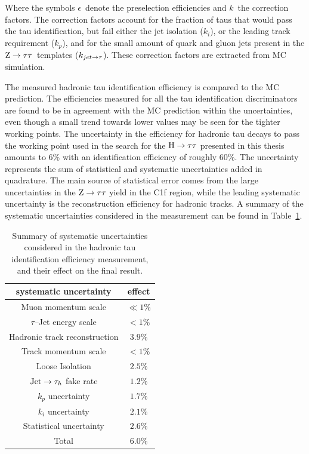Where the symbols $\epsilon$\ denote the preselection efficiencies and $k$\ the correction factors. The correction factors account for the fraction of taus that would pass the tau identification, but fail either the jet isolation ($k_i$), or the leading track requirement ($k_p$), and for the small amount of quark and gluon jets present in the $\mathrm{Z}\rightarrow\tau\tau$\ templates ($k_{jet \rightarrow \tau}$). These correction factors are extracted from MC simulation. 

The measured hadronic tau identification efficiency is compared to the MC prediction. %
The efficiencies measured for all the tau identification discriminators are found to be in agreement with the MC prediction within the uncertainties, even though a small trend towards lower values may be seen for the tighter working points. The uncertainty in the efficiency for hadronic tau decays to pass the working point used in the search for the $\mathrm{H}\rightarrow\tau\tau$ presented in this thesis amounts to 
 6\% with an identification efficiency of roughly 60\%. The uncertainty represents the sum of statistical and systematic uncertainties added in quadrature. The main source of statistical error comes from the large uncertainties in the $\mathrm{Z}\rightarrow\tau\tau$ yield in the C1f region, while the leading systematic uncertainty is the reconstruction efficiency for hadronic tracks. A summary of the systematic uncertainties considered in the measurement can be found in Table~\ref{tab:tau_eff_sys}.

\begin{table}
\begin{center}
\caption{Summary of systematic uncertainties considered in the hadronic tau identification efficiency measurement, and their effect on the final result.}
\label{tab:tau_eff_sys}
\begin{tabular}{|c|c|}
 \hline
 systematic uncertainty & effect \\
 \hline
Muon momentum scale & $\ll 1\%$ \\
$\tau$--Jet energy scale & $ < 1\%$ \\
Hadronic track reconstruction & $3.9\%$ \\
Track momentum scale & $< 1\%$ \\
Loose Isolation & $2.5\%$ \\
$\mathrm{Jet}\rightarrow\tau_h$ fake rate & $1.2\%$ \\
$k_p$ uncertainty & $1.7\%$ \\
$k_i$ uncertainty & $2.1\%$ \\
Statistical uncertainty & $2.6\%$ \\
\hline
Total & $6.0\%$ \\
\hline
\end{tabular}
\end{center}
\end{table}


